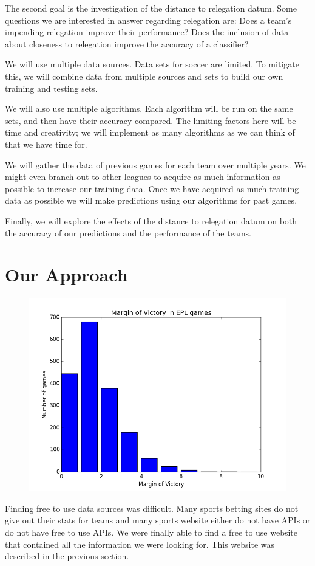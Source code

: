 \documentclass[conference]{IEEEtran}
\begin{document}
The second goal is the investigation of the distance to relegation datum. Some questions we are interested in answer regarding relegation are:
Does a team's impending relegation improve their performance?
Does the inclusion of data about closeness to relegation improve the accuracy of a classifier?

We will use multiple data sources. Data sets for soccer are limited. To mitigate this, we will combine data from multiple sources and sets to build our own training and testing sets.

We will also use multiple algorithms. Each algorithm will be run on the same sets, and then have their accuracy compared.  The limiting factors here will be time and creativity; we will implement as many algorithms as we can think of that we have time for.

We will gather the data of previous games for each team over multiple years. We might even branch out to other leagues to acquire as much information as possible to increase our training data. Once we have acquired as much training data as possible we will make predictions using our algorithms for past games.

Finally, we will explore the effects of the distance to relegation datum on both the accuracy of our predictions and the performance of the teams.
\section{Our Approach}
\begin{figure}[b]
\centering
\includegraphics[width=0.7\linewidth]{MarginOfVictory}
\caption{}
\label{fig:MarginOfVictory}
\end{figure}


Finding free to use data sources was difficult. Many sports betting sites do not give out their stats for teams and many sports website either do not have APIs or do not have free to use APIs. We were finally able to find a free to use website that contained all the information we were looking for. This website was described in the previous section.
\end{document}

